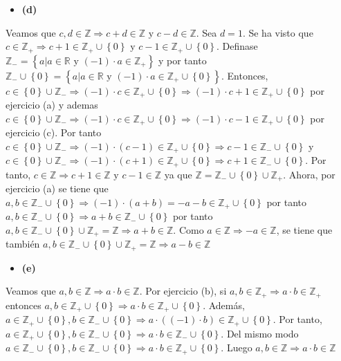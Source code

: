 \documentclass{article}
\begin{document}
\begin{itemize} 
\item \bf (d) \rm 
\end{itemize}
Veamos que \( c,d \in \mathbb{Z}\Rightarrow c+d \in \mathbb{Z} \text{ y } c-d\in \mathbb{Z}\). Sea \(d=1\). Se ha visto que \( c\in \mathbb{Z}_{+}\Rightarrow c+1 \in \mathbb{Z}_{+}\cup \left\{0\right\} \text{ y } c-1\in \mathbb{Z}_{+}\cup \left\{0\right\}\). Definase \(\mathbb{Z}_{-}=\left\{a|a\in \mathbb{R} \text{ y } (-1)\cdot a\in \mathbb{Z}_{+}\right\}\) y por tanto \(\mathbb{Z}_{-}\cup\left\{0\right\}=\left\{a|a\in \mathbb{R} \text{ y } (-1)\cdot a\in \mathbb{Z}_{+}\cup\left\{0\right\}\right\}\). Entonces, \(c\in\left\{0\right\}\cup\mathbb{Z}_{-}\Rightarrow (-1)\cdot c\in \mathbb{Z}_{+}\cup\left\{0\right\}\Rightarrow (-1)\cdot c+1\in \mathbb{Z}_{+}\cup\left\{0\right\}\) por ejercicio (a) y ademas \(c\in\left\{0\right\}\cup\mathbb{Z}_{-}\Rightarrow (-1)\cdot c\in \mathbb{Z}_{+}\cup\left\{0\right\}\Rightarrow (-1)\cdot c-1\in \mathbb{Z}_{+}\cup\left\{0\right\}\) por ejercicio (c). Por tanto  \(c\in\left\{0\right\}\cup\mathbb{Z}_{-}\Rightarrow (-1)\cdot \left(c-1\right)\in \mathbb{Z}_{+}\cup\left\{0\right\}\Rightarrow c-1\in \mathbb{Z}_{-}\cup\left\{0\right\}\) y \(c\in\left\{0\right\}\cup\mathbb{Z}_{-}\Rightarrow (-1)\cdot \left(c+1\right)\in \mathbb{Z}_{+}\cup\left\{0\right\}\Rightarrow c+1\in \mathbb{Z}_{-}\cup\left\{0\right\}\). Por tanto, \(c\in\mathbb{Z}\Rightarrow c+1\in \mathbb{Z} \text{ y } c-1\in \mathbb{Z}\) ya que \(\mathbb{Z}=\mathbb{Z}_{-}\cup\left\{0\right\}\cup \mathbb{Z}_{+}\). Ahora, por ejercicio (a) se tiene que \(a,b \in \mathbb{Z}_{-}\cup\left\{ 0 \right\}\Rightarrow \left(-1\right)\cdot\left( a+b\right) =-a-b \in \mathbb{Z}_{+}\cup\left\{0\right\}\) por tanto \(a,b \in \mathbb{Z}_{-}\cup\left\{0\right\}\Rightarrow   a+b\in \mathbb{Z}_{-}\cup\left\{0\right\}\) por tanto 
\(a,b \in \mathbb{Z}_{-}\cup\left\{0\right\}\cup \mathbb{Z}_{+}=\mathbb{Z}\Rightarrow  a+b \in \mathbb{Z}\). Como \(a \in \mathbb{Z}\Rightarrow -a \in \mathbb{Z}\), se tiene que también \(a,b \in \mathbb{Z}_{-}\cup\left\{0\right\}\cup \mathbb{Z}_{+}=\mathbb{Z}\Rightarrow  a-b \in \mathbb{Z}\)
\begin{itemize} 
\item \bf (e) \rm 
\end{itemize}
Veamos que \(a,b \in \mathbb{Z}\Rightarrow a\cdot b\in \mathbb{Z}\). Por ejercicio (b), si \(a,b \in \mathbb{Z}_{+}\Rightarrow a\cdot b\in \mathbb{Z}_{+}\) entonces \(a,b \in \mathbb{Z}_{+}\cup \left\{0\right\}\Rightarrow a\cdot b\in \mathbb{Z}_{+}\cup \left\{0\right\}\). Además, \(a \in \mathbb{Z}_{+}\cup \left\{0\right\} ,b\in \mathbb{Z}_{-}\cup \left\{0\right\}\Rightarrow a\cdot \left(\left(-1\right)\cdot b\right)\in \mathbb{Z}_{+}\cup \left\{0\right\}\). Por tanto,  \(a \in \mathbb{Z}_{+}\cup \left\{0\right\} ,b\in \mathbb{Z}_{-}\cup \left\{0\right\}\Rightarrow a\cdot b\in \mathbb{Z}_{-}\cup \left\{0\right\}\). Del mismo modo \(a \in \mathbb{Z}_{-}\cup \left\{0\right\} ,b\in \mathbb{Z}_{-}\cup \left\{0\right\}\Rightarrow a\cdot b\in \mathbb{Z}_{+}\cup \left\{0\right\}\). Luego \(a,b \in \mathbb{Z}\Rightarrow a\cdot b\in \mathbb{Z}\)
%
%
\end{document}
